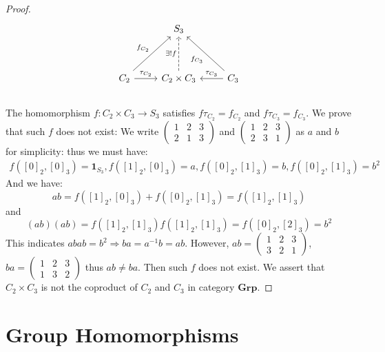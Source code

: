 \documentclass[a4paper, pdf, 12pt]{article}
\begin{document}
\begin{proof}
  $$
    \begin{tikzcd}[row sep=huge]
      & S_3 & \\
      C_2 \ar[r,"\tau_{C_2}"]  \ar[ur, "f_{C_2}"] & C_2\times C_3 \ar[u, dashed, "\exists!f"]& \ar[ul, "f_{C_3}"]\ar[l,"\tau_{C_3}",swap] C_3
    \end{tikzcd}
  $$
  \\
  \noindent
  The homomorphism $f: C_2\times C_3\rightarrow S_3$ satisfies $f\tau_{C_2}=f_{C_2}$ and $f\tau_{C_3}=f_{C_3}$.
  We prove that such $f$ does not exist:
  We write $
    \begin{pmatrix}
      1 & 2 & 3 \\
      2 & 1 & 3
    \end{pmatrix}
  $ and $
    \begin{pmatrix}
      1 & 2 & 3 \\
      2 & 3 & 1
    \end{pmatrix}
  $ as $a$ and $b$ for simplicity: thus we must have:
  $$
    \begin{aligned}
      f([0]_{2}, [0]_{3}) = \mathbf{1}_{S_{3}}, f([1]_{2}, [0]_{3}) = a, f([0]_{2}, [1]_{3}) = b, f([0]_{2}, [1]_{3}) = b^2
    \end{aligned}
  $$
  And we have:
  $$
    ab = f([1]_{2}, [0]_{3}) + f([0]_{2}, [1]_{3}) = f([1]_{2}, [1]_{3})
  $$
  and
  $$
    (ab)(ab) = f([1]_{2}, [1]_{3})f([1]_{2}, [1]_{3}) = f([0]_{2}, [2]_{3}) = b^2
  $$
  This indicates $abab=b^2\Rightarrow ba=a^{-1}b=ab$. However, $ab = \begin{pmatrix}
      1 & 2 & 3 \\
      3 & 2 & 1
    \end{pmatrix}
  $, $ba = \begin{pmatrix}
      1 & 2 & 3 \\
      1 & 3 & 2
    \end{pmatrix}$ thus $ab \neq ba$. Then such $f$ does not exist. We assert that $C_2\times C_3$ is not the coproduct of $C_2$ and $C_3$ in
  category $\textbf{Grp}$.
\end{proof}

\section*{Group Homomorphisms}
\end{document}
